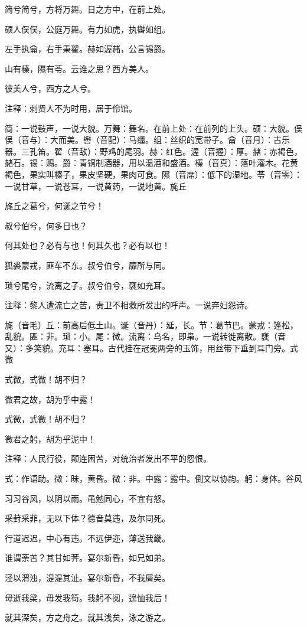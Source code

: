 \documentclass[12pt,UTF8]{ctexbook}
\begin{document}
简兮简兮，方将万舞。日之方中，在前上处。

硕人俣俣，公庭万舞。有力如虎，执辔如组。

左手执龠，右手秉翟。赫如渥赭，公言锡爵。

山有榛，隰有苓。云谁之思？西方美人。

彼美人兮，西方之人兮。

注释：刺贤人不为时用，居于伶馆。

简：一说鼓声，一说大貌。万舞：舞名。在前上处：在前列的上头。硕：大貌。俣俣（音与）：大而美。辔（音配）：马缰。组：丝织的宽带子。龠（音月）：古乐器。三孔笛。翟（音敌）：野鸡的尾羽。赫：红色。渥（音握）：厚。赭：赤褐色，赭石。锡：赐。爵：青铜制酒器，用以温酒和盛酒。榛（音真）：落叶灌木。花黄褐色，果实叫榛子，果皮坚硬，果肉可食。隰（音席）：低下的湿地。苓（音零）：一说甘草，一说苍耳，一说黄药，一说地黄。旄丘

旄丘之葛兮，何诞之节兮！

叔兮伯兮，何多日也？

何其处也？必有与也！何其久也？必有以也！

狐裘蒙戎，匪车不东。叔兮伯兮，靡所与同。

琐兮尾兮，流离之子。叔兮伯兮，褎如充耳。

注释：黎人遭流亡之苦，责卫不相救所发出的呼声。一说弃妇怨诗。

旄（音毛）丘：前高后低土山。诞（音丹）：延，长。节：葛节巴。蒙戎：篷松，乱貌。匪：非。琐：小。尾：微。流离：鸟名，即枭。一说转徙离散。褎（音又）：多笑貌。充耳：塞耳。古代挂在冠冕两旁的玉饰，用丝带下垂到耳门旁。式微

式微，式微！胡不归？

微君之故，胡为乎中露！

式微，式微！胡不归？

微君之躬，胡为乎泥中！

注释：人民行役，颠连困苦，对统治者发出不平的怨恨。 

式：作语助。微：昧，黄昏。微：非。中露：露中。倒文以协韵。躬：身体。谷风

习习谷风，以阴以雨。黾勉同心，不宜有怒。

采葑采菲，无以下体？德音莫违，及尔同死。

行道迟迟，中心有违。不远伊迩，薄送我畿。

谁谓荼苦？其甘如荠。宴尔新昏，如兄如弟。

泾以渭浊，湜湜其沚。宴尔新昏，不我屑矣。

毋逝我梁，毋发我笱。我躬不阅，遑恤我后！

就其深矣，方之舟之。就其浅矣，泳之游之。
\end{document}
